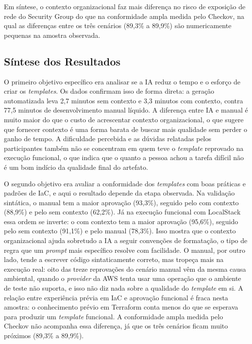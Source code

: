Em síntese, o contexto organizacional faz mais diferença no risco de exposição de rede do Security Group do que na conformidade ampla medida pelo Checkov, na qual as diferenças entre os três cenários (89,3\% a 89,9\%) são numericamente pequenas na amostra observada.

\subsection{Síntese dos Resultados}
\label{subsec:sintese}

O primeiro objetivo específico era analisar se a IA reduz o tempo e o esforço de criar os \textit{templates}. Os dados confirmam isso de forma direta: a geração automatizada leva 2,7 minutos sem contexto e 3,3 minutos com contexto, contra 77,5 minutos de desenvolvimento manual líquido. A diferença entre IA e manual é muito maior do que o custo de acrescentar contexto organizacional, o que sugere que fornecer contexto é uma forma barata de buscar mais qualidade sem perder o ganho de tempo. A dificuldade percebida e as dúvidas relatadas pelos participantes também não se concentram em quem teve o \textit{template} reprovado na execução funcional, o que indica que o quanto a pessoa achou a tarefa difícil não é um bom indício da qualidade final do artefato.

O segundo objetivo era avaliar a conformidade dos \textit{templates} com boas práticas e padrões de IaC, e aqui o resultado depende da etapa observada. Na validação sintática, o manual tem a maior aprovação (93,3\%), seguido pelo com contexto (88,9\%) e pelo sem contexto (62,2\%). Já na execução funcional com LocalStack essa ordem se inverte: o com contexto tem a maior aprovação (95,6\%), seguido pelo sem contexto (91,1\%) e pelo manual (78,3\%). Isso mostra que o contexto organizacional ajuda sobretudo a IA a seguir convenções de formatação, o tipo de regra que um \textit{prompt} mais específico resolve com facilidade. O manual, por outro lado, tende a escrever código sintaticamente correto, mas tropeça mais na execução real: oito das treze reprovações do cenário manual vêm da mesma causa ambiental, quando o \textit{provider} da AWS tenta usar uma operação que o ambiente de teste não suporta, e isso não diz nada sobre a qualidade do \textit{template} em si. A relação entre experiência prévia em IaC e aprovação funcional é fraca nesta amostra: o conhecimento prévio em Terraform conta menos do que se esperava para produzir um \textit{template} funcional. A conformidade ampla medida pelo Checkov não acompanha essa diferença, já que os três cenários ficam muito próximos (89,3\% a 89,9\%).

